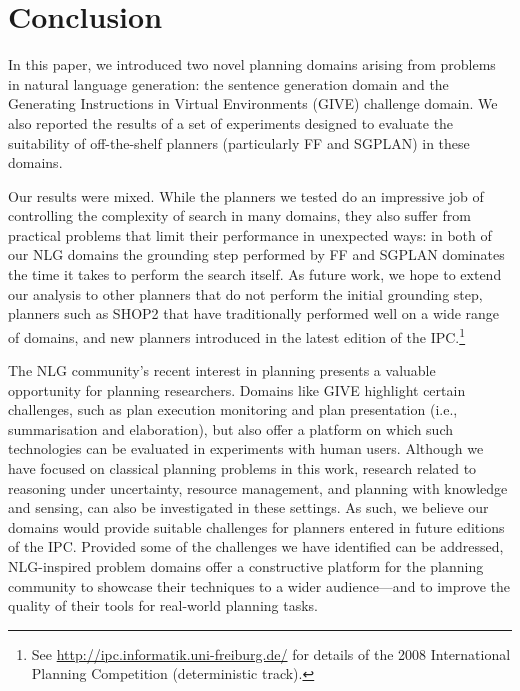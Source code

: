 
\section{Conclusion}
\label{sec:conclusion}

In this paper, we introduced two novel planning domains arising from
problems in natural language generation: the sentence generation domain and
the Generating Instructions in Virtual Environments (GIVE) challenge
domain. We also reported the results of a set of experiments designed to
evaluate the suitability of off-the-shelf planners (particularly FF and
SGPLAN) in these domains.

Our results were mixed. While the planners we tested do an impressive job
of controlling the complexity of search in many domains, they also suffer
from practical problems that limit their performance in unexpected ways: in
both of our NLG domains the grounding step performed by FF and SGPLAN
dominates the time it takes to perform the search itself. As future work,
we hope to extend our analysis to other planners that do not perform the
initial grounding step, planners such as SHOP2
\citep{DBLP:journals/jair/NauAIKMWY03} that have traditionally performed
well on a wide range of domains, and new planners introduced in the latest
edition of the IPC.\footnote{See
 \url{http://ipc.informatik.uni-freiburg.de/} for details of the 2008
 International Planning Competition (deterministic track).}

The NLG community's recent interest in planning presents a valuable
opportunity for planning researchers. Domains like GIVE highlight certain
challenges, such as plan execution monitoring and plan presentation (i.e.,
summarisation and elaboration), but also offer a platform on which such
technologies can be evaluated in experiments with human users. Although we
have focused on classical planning problems in this work, research related
to reasoning under uncertainty, resource management, and planning with
knowledge and sensing, can also be investigated in these settings. As such,
we believe our domains would provide suitable challenges for planners
entered in future editions of the IPC. Provided some of the challenges we
have identified can be addressed, NLG-inspired problem domains offer a
constructive platform for the planning community to showcase their
techniques to a wider audience---and to improve the quality of their tools
for real-world planning tasks. 




